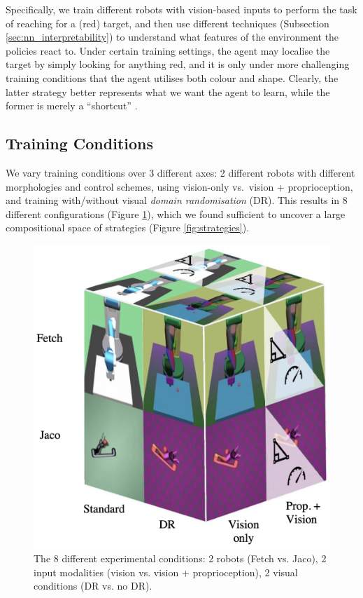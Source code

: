 Specifically, we train different robots with vision-based inputs to perform the task of reaching for a (red) target, and then use different techniques (Subsection \ref{sec:nn_interpretability}) to understand what features of the environment the policies react to. Under certain training settings, the agent may localise the target by simply looking for anything red, and it is only under more challenging training conditions that the agent utilises both colour and shape. Clearly, the latter strategy better represents what we want the agent to learn, while the former is merely a ``shortcut'' \cite{geirhos2020shortcut}.

\hypertarget{training-conditions}{%
\subsection{Training Conditions}\label{training-conditions}}
We vary training conditions over 3 different axes: 2 different robots with different morphologies and control schemes, using vision-only vs.~vision + proprioception, and training with/without visual \emph{domain randomisation} (DR). This results in 8 different configurations (Figure \ref{fig:axes}), which we found sufficient to uncover a large compositional space of strategies (Figure
\ref{fig:strategies}).

\begin{figure}
  \centering
  \includegraphics[width=0.85\linewidth]{figures/chapter6/axes.png}
  \caption{The 8 different experimental conditions: 2 robots (Fetch vs. Jaco), 2 input modalities (vision vs. vision + proprioception), 2 visual conditions (DR vs. no DR).}
  \label{fig:axes}
\end{figure}

